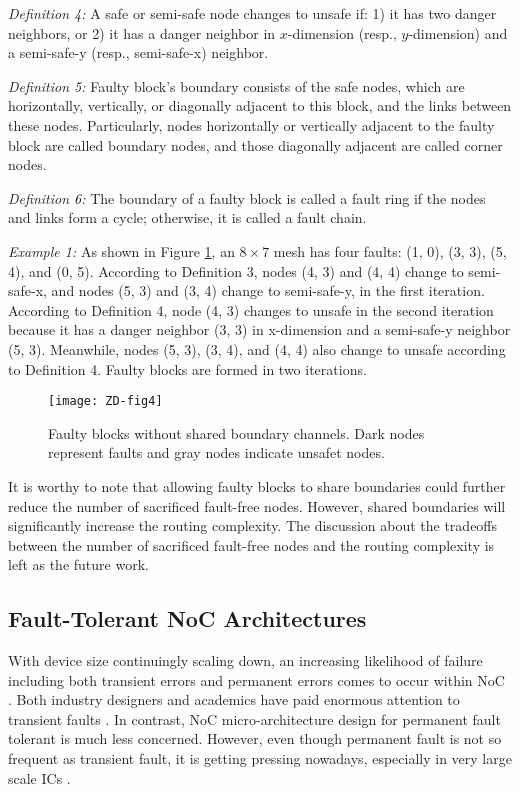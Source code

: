 \textit{Definition 4:} A safe or semi-safe node changes to unsafe if: 1) it has two danger neighbors, or 2) it has a danger neighbor in $x$-dimension (resp., $y$-dimension) and a semi-safe-y (resp., semi-safe-x) neighbor.

\textit{Definition 5:} Faulty block’s boundary consists of the safe nodes, which are horizontally, vertically, or diagonally adjacent to this block, and the links between these nodes. Particularly, nodes horizontally or vertically adjacent to the faulty block are called boundary nodes, and those diagonally adjacent are called corner nodes. 

\textit{Definition 6:} The boundary of a faulty block is called a fault ring if the nodes and links form a cycle; otherwise, it is called a fault chain.

\textit{Example 1:} As shown in Figure \ref{fig:ZD-fig4}, an $8 \times 7$ mesh has four faults: (1, 0), (3, 3), (5, 4), and (0, 5). According to Definition 3, nodes (4, 3) and (4, 4) change to semi-safe-x, and nodes (5, 3) and (3, 4) change to semi-safe-y, in the first iteration. According to Definition 4, node (4, 3) changes to unsafe in the second iteration because it has a danger neighbor (3, 3) in x-dimension and a semi-safe-y neighbor (5, 3). Meanwhile, nodes (5, 3), (3, 4), and (4, 4) also change to unsafe according to Definition 4. Faulty blocks are formed in two iterations.

\begin{figure}[h]
    \centering
        \texttt{[image: ZD-fig4]}
          \caption{Faulty blocks without shared boundary channels. Dark nodes represent faults and gray nodes indicate unsafet nodes.}
        \label{fig:ZD-fig4}
\end{figure}

It is worthy to note that allowing faulty blocks to share boundaries could further reduce the number of sacrificed fault-free nodes. However, shared boundaries will significantly increase the routing complexity. The discussion about the tradeoffs between the number of sacrificed fault-free nodes and the routing complexity is left as the future work.



\subsection{Fault-Tolerant NoC Architectures}
With device size continuingly scaling down, an increasing likelihood of failure including both transient errors and permanent errors comes to occur within NoC \cite{fan2009godson} \cite{pirretti2004fault}. Both industry designers and academics have paid enormous attention to transient faults \cite{gomez2006routing} \cite{moscibroda2009case} \cite{tsai2012scalable}. In contrast, NoC micro-architecture design for permanent fault tolerant is much less concerned. However, even though permanent fault is not so frequent as transient fault, it is getting pressing nowadays, especially in very large scale ICs \cite{fan2009godson}.

